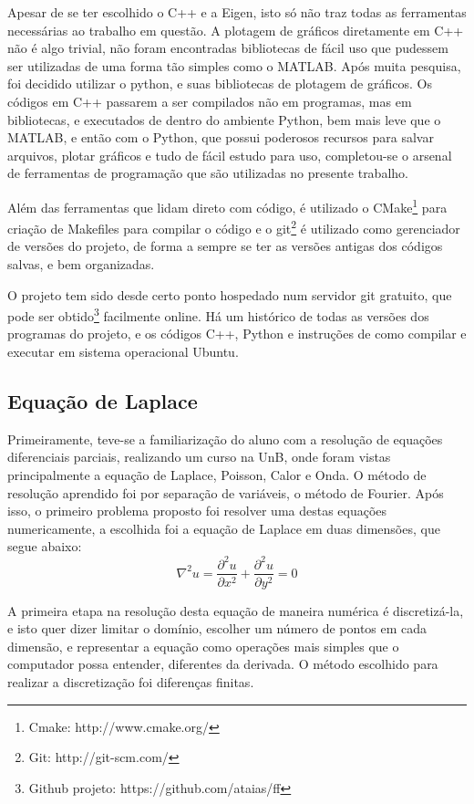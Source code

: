 \documentclass[journal]{IEEEtran}
\begin{document}
Apesar de se ter escolhido o C++ e a Eigen, isto só não traz todas as ferramentas necessárias ao trabalho em questão. A plotagem de gráficos diretamente em C++ não é algo trivial, não foram encontradas bibliotecas de fácil uso que pudessem ser utilizadas de uma forma tão simples como o MATLAB. Após muita pesquisa, foi decidido utilizar o python, e suas bibliotecas de plotagem de gráficos. Os códigos em C++ passarem a ser compilados não em programas, mas em bibliotecas, e executados de dentro do ambiente Python, bem mais leve que o MATLAB, e então com o Python, que possui poderosos recursos para salvar arquivos, plotar gráficos e tudo de fácil estudo para uso, completou-se o arsenal de ferramentas de programação que são utilizadas no presente trabalho.

Além das ferramentas que lidam direto com código, é utilizado o CMake\footnote{Cmake: http://www.cmake.org/} para criação de Makefiles para compilar o código e o git\footnote{Git: http://git-scm.com/} é utilizado como gerenciador de versões do projeto, de forma a sempre se ter as versões antigas dos códigos salvas, e bem organizadas.

O projeto tem sido desde certo ponto hospedado num servidor git gratuito, que pode ser obtido\footnote{Github projeto: https://github.com/ataias/ff} facilmente online. Há um histórico de todas as versões dos programas do projeto, e os códigos C++, Python e instruções de como compilar e executar em sistema operacional Ubuntu.
\subsection{Equação de Laplace}
Primeiramente, teve-se a familiarização do aluno com a resolução de equações diferenciais parciais, realizando um curso na UnB, onde foram vistas principalmente a equação de Laplace, Poisson, Calor e Onda. O método de resolução aprendido foi por separação de variáveis, o método de Fourier. Após isso, o primeiro problema proposto foi resolver uma destas equações numericamente, a escolhida foi a equação de Laplace em duas dimensões, que segue abaixo:
\begin{equation}
\nabla^2 u=\frac{\partial^2 u}{\partial x^2}+\frac{\partial^2 u}{\partial y^2}=0\label{laplace}
\end{equation}

A primeira etapa na resolução desta equação de maneira numérica é discretizá-la, e isto quer dizer limitar o domínio, escolher um número de pontos em cada dimensão, e representar a equação como operações mais simples que o computador possa entender, diferentes da derivada. O método escolhido para realizar a discretização foi diferenças finitas.
\end{document}
